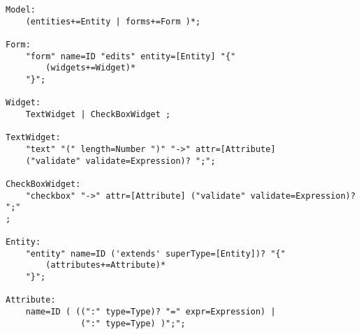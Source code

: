 %

\begin{lstlisting}[language=xtext,label=lst:grammar-plain,caption=Grammar with plain Xtext.] 
Model:
	(entities+=Entity | forms+=Form )*;

Form:
	"form" name=ID "edits" entity=[Entity] "{"	
		(widgets+=Widget)*
	"}";

Widget:
	TextWidget | CheckBoxWidget ;

TextWidget:
	"text" "(" length=Number ")" "->" attr=[Attribute] 
	("validate" validate=Expression)? ";";

CheckBoxWidget:
	"checkbox" "->" attr=[Attribute] ("validate" validate=Expression)? ";"
;

Entity:
	"entity" name=ID ('extends' superType=[Entity])? "{"
		(attributes+=Attribute)*
	"}";

Attribute:
	name=ID ( ((":" type=Type)? "=" expr=Expression) | 
               (":" type=Type) )";";
\end{lstlisting}

